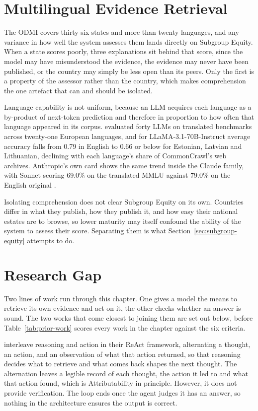 \section{Multilingual Evidence Retrieval}\label{sec:multilingual}

The ODMI covers thirty-six states and more than twenty languages, and any variance in how well the system assesses them lands directly on Subgroup Equity. When a state scores poorly, three explanations sit behind that score, since the model may have misunderstood the evidence, the evidence may never have been published, or the country may simply be less open than its peers. Only the first is a property of the assessor rather than the country, which makes comprehension the one artefact that can and should be isolated.

Language capability is not uniform, because an LLM acquires each language as a by-product of next-token prediction and therefore in proportion to how often that language appeared in its corpus. \citet{thellmann2024} evaluated forty LLMs on translated benchmarks across twenty-one European languages, and for LLaMA-3.1-70B-Instruct average accuracy falls from 0.79 in English to 0.66 or below for Estonian, Latvian and Lithuanian, declining with each language's share of CommonCrawl's web archives. Anthropic's own card shows the same trend inside the Claude family, with Sonnet scoring 69.0\% on the translated MMLU against 79.0\% on the English original \citep{anthropic2024}.

Isolating comprehension does not clear Subgroup Equity on its own. Countries differ in what they publish, how they publish it, and how easy their national estates are to browse, so lower maturity may itself confound the ability of the system to assess their score. Separating them is what Section~\ref{sec:subgroup-equity} attempts to do.

\section{Research Gap}\label{sec:research-gap}

Two lines of work run through this chapter. One gives a model the means to retrieve its own evidence and act on it, the other checks whether an answer is sound. The two works that come closest to joining them are set out below, before Table~\ref{tab:prior-work} scores every work in the chapter against the six criteria.

\citet{yao2023} interleave reasoning and action in their ReAct framework, alternating a thought, an action, and an observation of what that action returned, so that reasoning decides what to retrieve and what comes back shapes the next thought. The alternation leaves a legible record of each thought, the action it led to and what that action found, which is Attributability in principle. However, it does not provide verification. The loop ends once the agent judges it has an answer, so nothing in the architecture ensures the output is correct.

